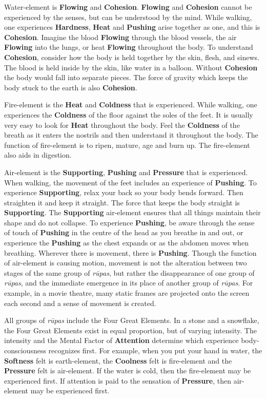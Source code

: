 Water-element is \textbf{Flowing} and \textbf{Cohesion}. \textbf{Flowing} and \textbf{Cohesion} cannot be experienced by the senses, but can be understood by the mind. While walking, one experiences \textbf{Hardness}, \textbf{Heat} and \textbf{Pushing} arise together as one, and this is \textbf{Cohesion}. Imagine the blood \textbf{Flowing} through the blood vessels, the air \textbf{Flowing} into the lungs, or heat \textbf{Flowing} throughout the body. To understand \textbf{Cohesion}, consider how the body is held together by the skin, flesh, and sinews. The blood is held inside by the skin, like water in a balloon. Without \textbf{Cohesion} the body would fall into separate pieces. The force of gravity which keeps the body stuck to the earth is also \textbf{Cohesion}.

Fire-element is the \textbf{Heat} and \textbf{Coldness} that is experienced. While walking, one experiences the \textbf{Coldness} of the floor against the soles of the feet. It is usually very easy to look for \textbf{Heat} throughout the body. Feel the \textbf{Coldness} of the breath as it enters the nostrils and then understand it throughout the body. The function of fire-element is to ripen, mature, age and burn up. The fire-element also aids in digestion.

Air-element is the \textbf{Supporting}, \textbf{Pushing} and \textbf{Pressure} that is experienced. When walking, the movement of the feet includes an experience of \textbf{Pushing}. To experience \textbf{Supporting}, relax your back so your body bends forward. Then straighten it and keep it straight. The force that keeps the body straight is \textbf{Supporting}. The \textbf{Supporting} air-element ensures that all things maintain their shape and do not collapse. To experience \textbf{Pushing}, be aware through the sense of touch of \textbf{Pushing} in the centre of the head as you breathe in and out, or experience the \textbf{Pushing} as the chest expands or as the abdomen moves when breathing. Wherever there is movement, there is \textbf{Pushing}. Though the function of air-element is causing motion, movement is not the alteration between two stages of the same group of \textit{rūpas}, but rather the disappearance of one group of \textit{rūpas}, and the immediate emergence in its place of another group of \textit{rūpas}. For example, in a movie theatre, many static frames are projected onto the screen each second and a sense of movement is created.

All groups of \textit{rūpas} include the Four Great Elements. In a stone and a snowflake, the Four Great Elements exist in equal proportion, but of varying intensity. The intensity and the Mental Factor of \textbf{Attention} determine which experience body-consciousness recognizes first. For example, when you put your hand in water, the \textbf{Softness} felt is earth-element, the \textbf{Coolness} felt is fire-element and the \textbf{Pressure} felt is air-element. If the water is cold, then the fire-element may be experienced first. If attention is paid to the sensation of \textbf{Pressure}, then air-element may be experienced first.


